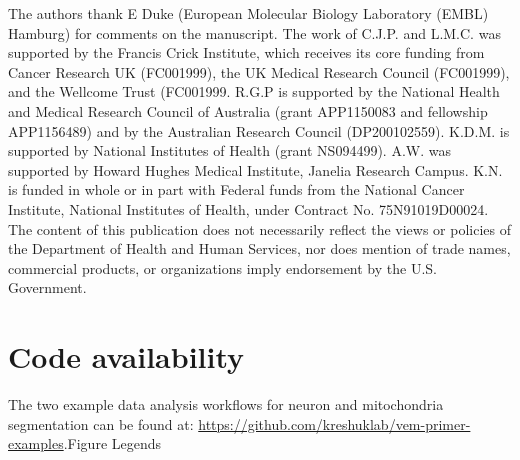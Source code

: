 \documentclass{article}
\begin{document}
The authors thank E Duke (European Molecular Biology Laboratory (EMBL) Hamburg) for comments on the manuscript. The work of C.J.P. and L.M.C. was supported by the Francis Crick Institute, which receives its core funding from Cancer Research UK (FC001999), the UK Medical Research Council (FC001999), and the Wellcome Trust (FC001999. R.G.P is supported by the National Health and Medical Research Council of Australia (grant APP1150083 and fellowship APP1156489) and by the Australian Research Council (DP200102559). K.D.M. is supported by National Institutes of Health (grant NS094499). A.W. was supported by Howard Hughes Medical Institute, Janelia Research Campus. K.N. is funded in whole or in part with Federal funds from the National Cancer Institute, National Institutes of Health, under Contract No. 75N91019D00024. The content of this publication does not necessarily reflect the views or policies of the Department of Health and Human Services, nor does mention of trade names, commercial products, or organizations imply endorsement by the U.S. Government.


\section*{Code availability}

The two example data analysis workflows for neuron and mitochondria segmentation can be found at: \url{https://github.com/kreshuklab/vem-primer-examples}.Figure Legends
\end{document}
